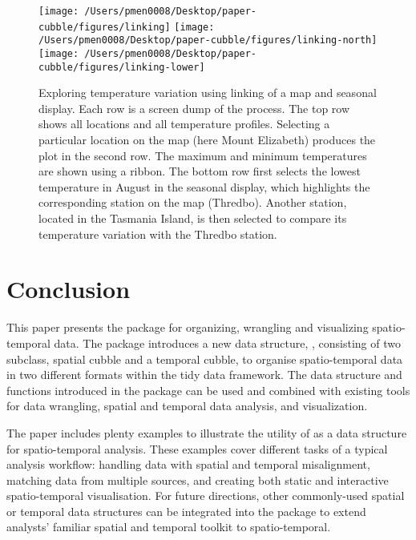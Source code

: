 \documentclass[
  shortnames]{jss}
\begin{document}
\begin{CodeChunk}
\begin{figure}

{\centering \texttt{[image: /Users/pmen0008/Desktop/paper-cubble/figures/linking]} \texttt{[image: /Users/pmen0008/Desktop/paper-cubble/figures/linking-north]} \texttt{[image: /Users/pmen0008/Desktop/paper-cubble/figures/linking-lower]} 

}

\caption[Exploring temperature variation using linking of a map and seasonal display]{Exploring temperature variation using linking of a map and seasonal display. Each row is a screen dump of the process. The top row shows all locations and all temperature profiles. Selecting a particular location on the map (here Mount Elizabeth) produces the plot in the second row. The maximum and minimum temperatures are shown using a ribbon. The bottom row first selects the lowest temperature in August in the seasonal display, which highlights the corresponding station on the map (Thredbo). Another  station, located in the Tasmania Island, is then selected to compare its temperature variation with the Thredbo station.}\label{fig:interactive-linking}
\end{figure}
\end{CodeChunk}

\hypertarget{conclude}{%
\section{Conclusion}\label{conclude}}

This paper presents the  package  for organizing, wrangling and visualizing spatio-temporal data. The package introduces a new data structure, , consisting of two subclass, spatial cubble and a temporal cubble, to organise spatio-temporal data in two different formats within the tidy data framework. The data structure and functions introduced in the package can be used and combined with existing tools for data wrangling, spatial and temporal data analysis, and visualization.

The paper includes plenty examples to illustrate the utility of  as a data structure for spatio-temporal analysis. These examples cover different tasks of a typical analysis workflow: handling data with spatial and temporal misalignment, matching data from multiple sources, and creating both static and interactive spatio-temporal visualisation. For future directions, other commonly-used spatial or temporal data structures can be integrated into the  package to extend analysts' familiar spatial and temporal toolkit to spatio-temporal.
\end{document}
